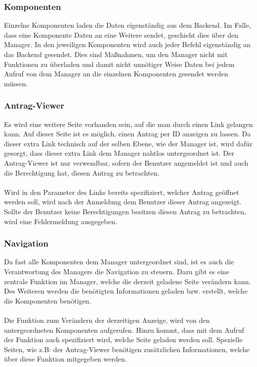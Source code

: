 \subsubsection{Komponenten}
Einzelne Komponenten laden die Daten eigenständig aus dem Backend. Im Falle, dass eine Komponente Daten an eine Weitere sendet, geschieht dies über den Manager. In den jeweiligen Komponenten wird auch jeder Befehl eigenständig an das Backend gesendet. Dies sind Maßnahmen, um den Manager nicht mit Funktionen zu überladen und damit nicht unnötiger Weise Daten bei jedem Aufruf von dem Manager an die einzelnen Komponenten gesendet werden müssen.

\subsubsection{Antrag-Viewer}
Es wird eine weitere Seite vorhanden sein, auf die man durch einen Link gelangen kann. Auf dieser Seite ist es möglich, einen Antrag per ID anzeigen zu lassen. Da dieser extra Link technisch auf der selben Ebene, wie der Manager ist, wird dafür gesorgt, dass dieser extra Link dem Manager nahtlos untergeordnet ist. Der Antrag-Viewer ist nur verwendbar, sofern der Benutzer angemeldet ist und auch die Berechtigung hat, diesen Antrag zu betrachten.
\\\\
Wird in den Parameter des Links bereits spezifiziert, welcher Antrag geöffnet werden soll, wird nach der Anmeldung dem Benutzer dieser Antrag angezeigt. Sollte der Benutzer keine Berechtigungen besitzen diesen Antrag zu betrachten, wird eine Fehlermeldung ausgegeben.

\subsubsection{Navigation}
Da fast alle Komponenten dem Manager untergeordnet sind, ist es auch die Verantwortung des Managers die Navigation zu steuern. Dazu gibt es eine zentrale Funktion im Manager, welche die derzeit geladene Seite verändern kann. Des Weiteren werden die benötigten Informationen geladen bzw. erstellt, welche die Komponenten benötigen.
\\\\
Die Funktion zum Verändern der derzeitigen Anzeige, wird von den untergeordneten Komponenten aufgerufen. Hinzu kommt, dass mit dem Aufruf der Funktion auch spezifiziert wird, welche Seite geladen werden soll. Spezielle Seiten, wie z.B: der Antrag-Viewer benötigen zusätzlichen Informationen, welche über diese Funktion mitgegeben werden.


